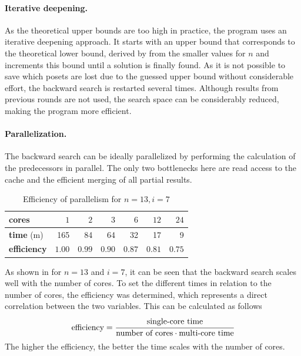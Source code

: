 \documentclass[twoside,leqno,twocolumn]{article}
\begin{document}
\paragraph{Iterative deepening.}
As the theoretical upper bounds are too high in practice, the program uses an iterative deepening approach.
It starts with an upper bound that corresponds to the theoretical lower bound, derived by  from the smaller values for $n$ and increments this bound until a solution is finally found.
As it is not possible to save which posets are lost due to the guessed upper bound without considerable effort, the backward search is restarted several times.
Although results from previous rounds are not used, the search space can be considerably reduced, making the program more efficient.

\paragraph{Parallelization.} \label{sec:backward:parallelisation}
The backward search can be ideally parallelized by performing the calculation of the predecessors in parallel.
The only two bottlenecks here are read access to the cache and the efficient merging of all partial results.

\begin{table}[!t]
  \renewcommand{\arraystretch}{1.1}
  \caption{Efficiency of parallelism for $n = 13, i = 7$}
  \label{table:backward-parallel}
  \centering
  \small
  \begin{tabular}{l|rrrrrr}
    \textbf{cores}      & $1$    & $2$    & $3$    & $6$    & $12$   & $24$   \\ \hline
    \textbf{time} (m)   & 165    & 84     & 64     & 32     & 17     & 9      \\ \hline
    \textbf{efficiency} & $1.00$ & $0.99$ & $0.90$ & $0.87$ & $0.81$ & $0.75$
  \end{tabular}
\end{table}

As shown in  for $n = 13$ and $i = 7$, it can be seen that the backward search scales well with the number of cores.
To set the different times in relation to the number of cores, the efficiency was determined, which represents a direct correlation between the two variables.
This can be calculated as follows
\[
  \text{efficiency} = \cfrac{\text{single-core time}}{\text{number of cores} \cdot \text{multi-core time}}
\]
The higher the efficiency, the better the time scales with the number of cores.
\end{document}
